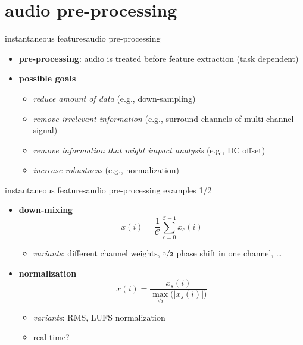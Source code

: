     \section[pre-proc]{audio pre-processing}
        \begin{frame}{instantaneous features}{audio pre-processing}
            \begin{itemize}
                \item   \textbf{pre-processing}: audio is treated before feature extraction (task dependent)
                \bigskip
                \item   \textbf{possible goals} 
                    \begin{itemize}
                        \item   \textit{reduce amount of data} (e.g., down-sampling)
                        \item   \textit{remove irrelevant information} (e.g., surround channels of multi-channel signal)
                        \item   \textit{remove information that might impact analysis} (e.g., DC offset)
                        \item   \textit{increase robustness} (e.g., normalization)
                    \end{itemize}
            \end{itemize}
        \end{frame}
        \begin{frame}{instantaneous features}{audio pre-processing examples 1/2}
            \begin{itemize}
                \item   \textbf{down-mixing}
                    \[
                        x(i) = \frac{1}{\mathcal{C}}\sum\limits_{c=0}^{\mathcal{C}-1}{x_c(i)} 
                    \]
                    \begin{itemize}
                        \item   \textit{variants}: different channel weights, $\nicefrac{\pi}{2}$ phase shift in one channel, \ldots
                    \end{itemize}
                    
                \bigskip
                \item<2->   \textbf{normalization}
                    \[
                        x(i) = \frac{x_s(i)}{\max\limits_{\forall i}\big(|x_s(i)|\big)} 
                    \]
                    \begin{itemize}
                        \item   \textit{variants}: RMS, LUFS normalization
                        \item   real-time?
                    \end{itemize}
            \end{itemize}
        \end{frame}
